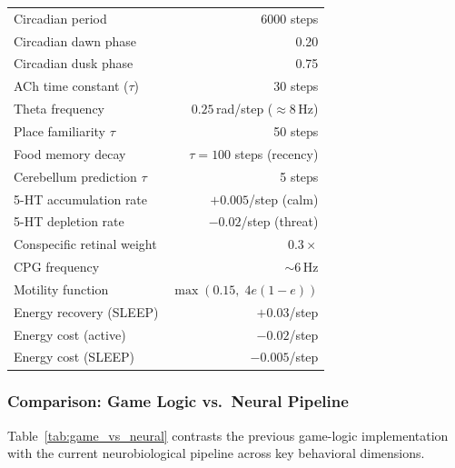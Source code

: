 \documentclass[11pt,a4paper]{article}
\begin{document}
\begin{table}[H]
\begin{tabular}{lr}
Circadian period                     & 6000 steps \\
Circadian dawn phase                 & 0.20 \\
Circadian dusk phase                 & 0.75 \\
ACh time constant ($\tau$)           & 30 steps \\
Theta frequency                      & $0.25$\,rad/step ($\approx 8$\,Hz) \\
Place familiarity $\tau$             & 50 steps \\
Food memory decay                    & $\tau = 100$ steps (recency) \\
Cerebellum prediction $\tau$         & 5 steps \\
5-HT accumulation rate               & $+0.005$/step (calm) \\
5-HT depletion rate                  & $-0.02$/step (threat) \\
Conspecific retinal weight            & $0.3\times$ \\
CPG frequency                        & $\sim 6$\,Hz \\
Motility function                    & $\max(0.15,\; 4e(1{-}e))$ \\
Energy recovery (SLEEP)              & $+0.03$/step \\
Energy cost (active)                 & $-0.02$/step \\
Energy cost (SLEEP)                  & $-0.005$/step \\
\bottomrule
\end{tabular}
\end{table}

\subsubsection{Comparison: Game Logic vs.\ Neural Pipeline}

Table~\ref{tab:game_vs_neural} contrasts the previous game-logic implementation
with the current neurobiological pipeline across key behavioral dimensions.
\end{document}
